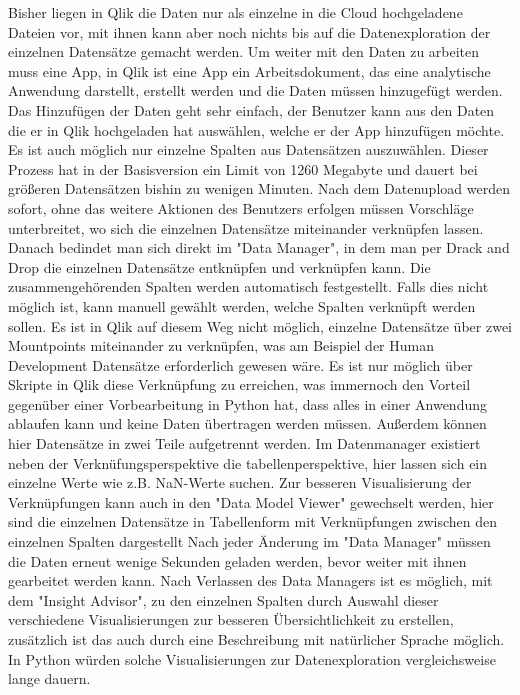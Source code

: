 \documentclass[12pt]{article}
\begin{document}
	Bisher liegen in Qlik die Daten nur als einzelne in die Cloud hochgeladene Dateien vor, mit ihnen kann aber noch nichts bis auf die Datenexploration der einzelnen Datensätze gemacht werden. Um weiter mit den Daten zu arbeiten muss eine App, in Qlik ist eine App ein Arbeitsdokument, das eine analytische Anwendung darstellt, erstellt werden und die Daten müssen hinzugefügt werden. Das Hinzufügen der Daten geht sehr einfach, der Benutzer kann aus den Daten die er in Qlik hochgeladen hat auswählen, welche er der App hinzufügen möchte. Es ist auch möglich nur einzelne Spalten aus Datensätzen auszuwählen. Dieser Prozess hat in der Basisversion ein Limit von 1260 Megabyte und dauert bei größeren Datensätzen bishin zu wenigen Minuten.
	Nach dem Datenupload werden sofort, ohne das weitere Aktionen des Benutzers erfolgen müssen Vorschläge unterbreitet, wo sich die einzelnen Datensätze miteinander verknüpfen lassen. Danach bedindet man sich direkt im "Data Manager", in dem man per Drack and Drop die einzelnen Datensätze entknüpfen und verknüpfen kann. Die zusammengehörenden Spalten werden automatisch festgestellt. Falls dies nicht möglich ist, kann manuell gewählt werden, welche Spalten verknüpft werden sollen.
	Es ist in Qlik auf diesem Weg nicht möglich, einzelne Datensätze über zwei Mountpoints miteinander zu verknüpfen, was am Beispiel der Human Development Datensätze erforderlich gewesen wäre. Es ist nur möglich über Skripte in Qlik diese Verknüpfung zu erreichen, was immernoch den Vorteil gegenüber einer Vorbearbeitung in Python hat, dass alles in einer Anwendung ablaufen kann und keine Daten übertragen werden müssen.
	Außerdem können hier Datensätze in zwei Teile aufgetrennt werden.
	Im Datenmanager existiert neben der Verknüfungsperspektive die tabellenperspektive, hier lassen sich ein einzelne Werte wie z.B. NaN-Werte suchen.
	Zur besseren Visualisierung der Verknüpfungen kann auch in den "Data Model Viewer" gewechselt werden, hier sind die einzelnen Datensätze in Tabellenform mit Verknüpfungen zwischen den einzelnen Spalten dargestellt
	Nach jeder Änderung im "Data Manager" müssen die Daten erneut wenige Sekunden geladen werden, bevor weiter mit ihnen gearbeitet werden kann.
	Nach Verlassen des Data Managers ist es möglich, mit dem "Insight Advisor", zu den einzelnen Spalten durch 
	Auswahl dieser verschiedene Visualisierungen zur besseren Übersichtlichkeit zu erstellen, zusätzlich ist das auch durch eine Beschreibung mit natürlicher Sprache möglich. In Python würden solche Visualisierungen zur Datenexploration vergleichsweise lange dauern.
	
\end{document}
